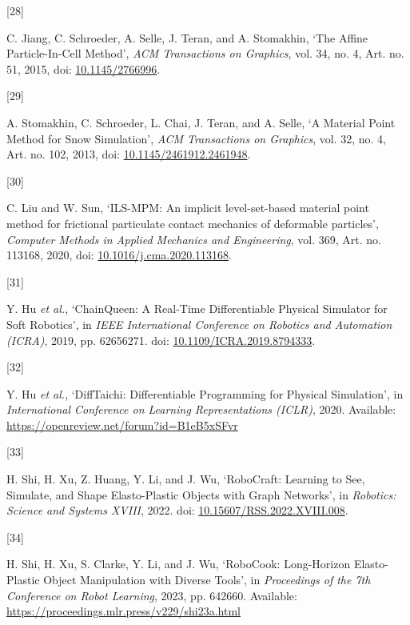 \documentclass[
  11pt,
]{article}
\newlength{\cslhangindent}
\newlength{\csllabelwidth}
\newenvironment{CSLReferences}[2] %
 {\begin{list}{}{%
  \setlength{\itemindent}{0pt}
  \setlength{\leftmargin}{0pt}
  \setlength{\parsep}{0pt}
  \ifodd #1
   \setlength{\leftmargin}{\cslhangindent}
   \setlength{\itemindent}{-1\cslhangindent}
  \fi
  \setlength{\itemsep}{#2\baselineskip}}}
 {\end{list}}
\newcommand{\CSLLeftMargin}[1]{\parbox[t]{\csllabelwidth}{\strut#1\strut}}
\newcommand{\CSLRightInline}[1]{\parbox[t]{\linewidth - \csllabelwidth}{\strut#1\strut}}
\begin{document}
\begin{CSLReferences}{0}{0}
\CSLLeftMargin{{[}28{]} }%
\CSLRightInline{C. Jiang, C. Schroeder, A. Selle, J. Teran, and A.
Stomakhin, {`The Affine Particle-In-Cell Method'}, \emph{ACM
Transactions on Graphics}, vol. 34, no. 4, Art. no. 51, 2015, doi:
\href{https://doi.org/10.1145/2766996}{10.1145/2766996}.}

\CSLLeftMargin{{[}29{]} }%
\CSLRightInline{A. Stomakhin, C. Schroeder, L. Chai, J. Teran, and A.
Selle, {`A Material Point Method for Snow Simulation'}, \emph{ACM
Transactions on Graphics}, vol. 32, no. 4, Art. no. 102, 2013, doi:
\href{https://doi.org/10.1145/2461912.2461948}{10.1145/2461912.2461948}.}

\CSLLeftMargin{{[}30{]} }%
\CSLRightInline{C. Liu and W. Sun, {`ILS-MPM: An implicit
level-set-based material point method for frictional particulate contact
mechanics of deformable particles'}, \emph{Computer Methods in Applied
Mechanics and Engineering}, vol. 369, Art. no. 113168, 2020, doi:
\href{https://doi.org/10.1016/j.cma.2020.113168}{10.1016/j.cma.2020.113168}.}

\CSLLeftMargin{{[}31{]} }%
\CSLRightInline{Y. Hu \emph{et al.}, {`ChainQueen: A Real-Time
Differentiable Physical Simulator for Soft Robotics'}, in \emph{IEEE
International Conference on Robotics and Automation (ICRA)}, 2019, pp.
6265\textendash{}\allowbreak{}6271. doi:
\href{https://doi.org/10.1109/ICRA.2019.8794333}{10.1109/ICRA.2019.8794333}.}

\CSLLeftMargin{{[}32{]} }%
\CSLRightInline{Y. Hu \emph{et al.}, {`DiffTaichi: Differentiable
Programming for Physical Simulation'}, in \emph{International Conference
on Learning Representations (ICLR)}, 2020. Available:
\url{https://openreview.net/forum?id=B1eB5xSFvr}}

\CSLLeftMargin{{[}33{]} }%
\CSLRightInline{H. Shi, H. Xu, Z. Huang, Y. Li, and J. Wu, {`RoboCraft:
Learning to See, Simulate, and Shape Elasto-Plastic Objects with Graph
Networks'}, in \emph{Robotics: Science and Systems XVIII}, 2022. doi:
\href{https://doi.org/10.15607/RSS.2022.XVIII.008}{10.15607/RSS.2022.XVIII.008}.}

\CSLLeftMargin{{[}34{]} }%
\CSLRightInline{H. Shi, H. Xu, S. Clarke, Y. Li, and J. Wu, {`RoboCook:
Long-Horizon Elasto-Plastic Object Manipulation with Diverse Tools'}, in
\emph{Proceedings of the 7th Conference on Robot Learning}, 2023, pp.
642\textendash{}\allowbreak{}660. Available:
\url{https://proceedings.mlr.press/v229/shi23a.html}}


\end{CSLReferences}
\end{document}
